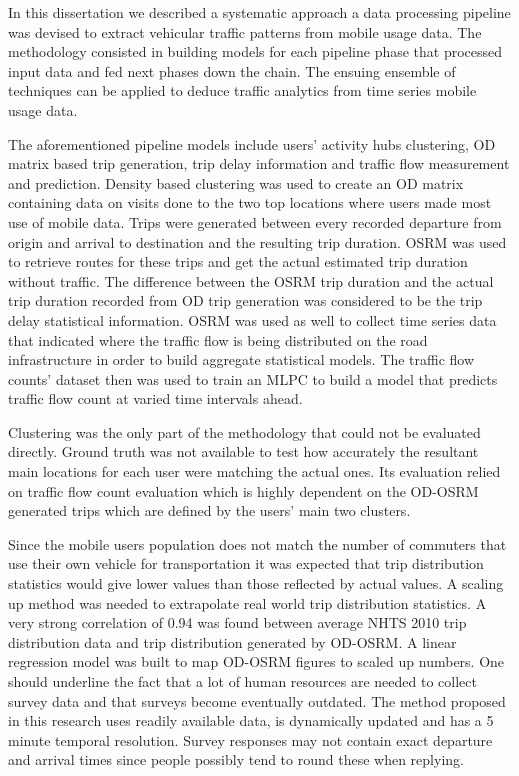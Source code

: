 \documentclass[12pt, a4paper]{report}
\theoremstyle{definition}
\theoremstyle{definition}%
\theoremstyle{definition}%
\theoremstyle{definition}%
\theoremstyle{definition}%
\theoremstyle{definition}%
\begin{document}
In this dissertation we described a systematic approach a data processing pipeline was devised to extract vehicular traffic patterns from mobile usage data. The methodology consisted in building models for each pipeline phase that processed input data and fed next phases down the chain. The ensuing ensemble of techniques can be applied to deduce traffic analytics from time series mobile usage data. 

The aforementioned pipeline models include users' activity hubs clustering, OD matrix based trip generation, trip delay information and traffic flow measurement and prediction. Density based clustering was used to create an OD matrix containing data on visits done to the two top locations where users made most use of mobile data. Trips were generated between every recorded departure from origin and arrival to destination and the resulting trip duration. OSRM was used to retrieve routes for these trips and get the actual estimated trip duration without traffic. The difference between the OSRM trip duration and the actual trip duration recorded from OD trip generation was considered to be the trip delay statistical information. OSRM was used as well to collect time series data that indicated where the traffic flow is being distributed on the road infrastructure in order to build aggregate statistical models. The traffic flow counts' dataset then was used to train an MLPC to build a model that predicts traffic flow count at varied time intervals ahead.

Clustering was the only part of the methodology that could not be evaluated directly. Ground truth was not available to test how  accurately the resultant main locations for each user were matching the actual ones. Its evaluation relied on traffic flow count evaluation which is highly dependent on the OD-OSRM generated trips which are defined by the users' main two clusters.

Since the mobile users population does not match the number of commuters that use their own vehicle for transportation it was expected that trip distribution statistics would give lower values than those reflected by actual values. A scaling up method was needed to extrapolate real world trip distribution statistics. A very strong correlation of 0.94 was found between average NHTS 2010 trip distribution data and trip distribution generated by OD-OSRM. A linear regression model was built to map OD-OSRM figures to scaled up numbers. One should underline the fact that a lot of human resources are needed to collect survey data and that surveys become eventually outdated. The method proposed in this research uses readily available data, is dynamically updated and has a 5 minute temporal resolution. Survey responses may not contain exact departure and arrival times since people possibly tend to round these when replying.
\end{document}
